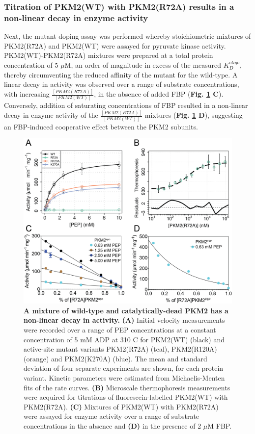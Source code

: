 \subsubsection{Titration of PKM2(WT) with PKM2(R72A) results in a non-linear decay in enzyme activity}
Next, the mutant doping assay was performed whereby stoichiometric mixtures of PKM2(R72A) and PKM2(WT) were assayed for pyruvate kinase activity. PKM2(WT)-PKM2(R72A) mixtures were prepared at a total protein concentration of 5 $\mu$M, an order of magnitude in excess of the measured $K_{D}^{oligo}$, thereby circumventing the reduced affinity of the mutant for the wild-type. A linear decay in activity was observed over a range of substrate concentrations, with increasing $\frac{[PKM2(R72A)]}{[PKM2(WT)]}$, in the absence of added FBP (\textbf{Fig. \ref{fig:mut_doping_exp} C}). Conversely, addition of saturating concentrations of FBP resulted in a non-linear decay in enzyme activity of the $\frac{[PKM2(R72A)]}{[PKM2(WT)]}$ mixtures (\textbf{Fig. \ref{fig:mut_doping_exp} D}), suggesting an FBP-induced cooperative effect between the PKM2 subunits.
%
%
%
\begin{figure}[!ht]
\includegraphics[scale=0.7]{ch4_fig8_mutant_doping_exp.png}
\caption[A mixture of wild-type and catalytically-dead PKM2 has a non-linear decay in activity.] {\textbf{A mixture of wild-type and catalytically-dead PKM2 has a non-linear decay in activity.} \textbf{(A)} Initial velocity measurements were recorded over a range of PEP concentrations at a constant concentration of 5 mM ADP at 310 \textdegree C for PKM2(WT) (black) and active-site mutant variants PKM2(R72A) (teal), PKM2(R120A) (orange) and PKM2(K270A) (blue). The mean and standard deviation of four separate experiments are shown, for each protein variant. Kinetic parameters were estimated from Michaelis-Menten fits of the rate curves. \textbf{(B)} Microscale thermophoresis measurements were acquired for titrations of fluorescein-labelled PKM2(WT) with PKM2(R72A). \textbf{(C)} Mixtures of PKM2(WT) with PKM2(R72A) were assayed for enzyme activity over a range of substrate concentrations in the absence and \textbf{(D)} in the presence of 2 $\mu$M FBP.}
\label{fig:mut_doping_exp}
\end{figure}
%
%
\clearpage

